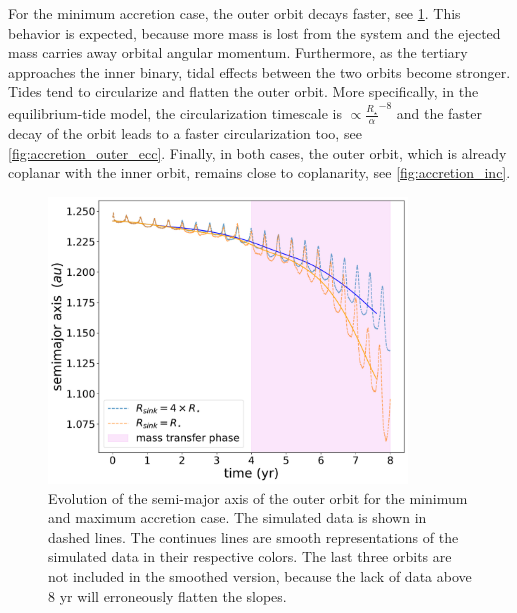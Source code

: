 For the minimum accretion case, the outer orbit decays faster, see \cref{fig:accretion_outer_semimajor_axis}. This behavior is expected, because more mass is lost from the system and the ejected mass carries away orbital angular momentum. Furthermore, as the tertiary approaches the inner binary, tidal effects between the two orbits become stronger. Tides tend to circularize and flatten the outer orbit. More specifically, in the equilibrium-tide model, the circularization timescale is $\propto \frac{R_{\star}}{\alpha}^{-8}$ and the faster decay of the orbit leads to a faster circularization too, see \cref{fig:accretion_outer_ecc}. Finally, in both cases, the outer orbit, which is already coplanar with the inner orbit, remains close to coplanarity, see \cref{fig:accretion_inc}.
\begin{figure}[!htb]
    \centering
    \includegraphics[width=0.85\textwidth]{Thesis/graphs/accretion_case/accretion_outer_semimajor_axis.pdf}
    \caption{Evolution of the semi-major axis of the outer orbit for the minimum and maximum accretion case. The simulated data is shown in dashed lines. The continues lines are smooth representations of the simulated data in their respective colors. The last three orbits are not included in the smoothed version, because the lack of data above $8$ yr will erroneously flatten the slopes.}
    \label{fig:accretion_outer_semimajor_axis}
\end{figure}
